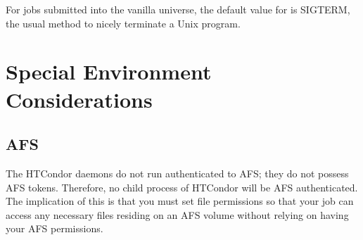 For jobs submitted into the vanilla universe, the default value for
 is SIGTERM,
the usual method to nicely terminate a Unix program.













%


\section{Special Environment Considerations}

\subsection{AFS}

The HTCondor daemons do not run authenticated to AFS; they do not possess
AFS tokens.
Therefore, no child process of HTCondor will be AFS authenticated.
The implication of this is that you must set file permissions so
that your job can access any necessary files residing on an AFS volume
without relying on having your AFS permissions.

